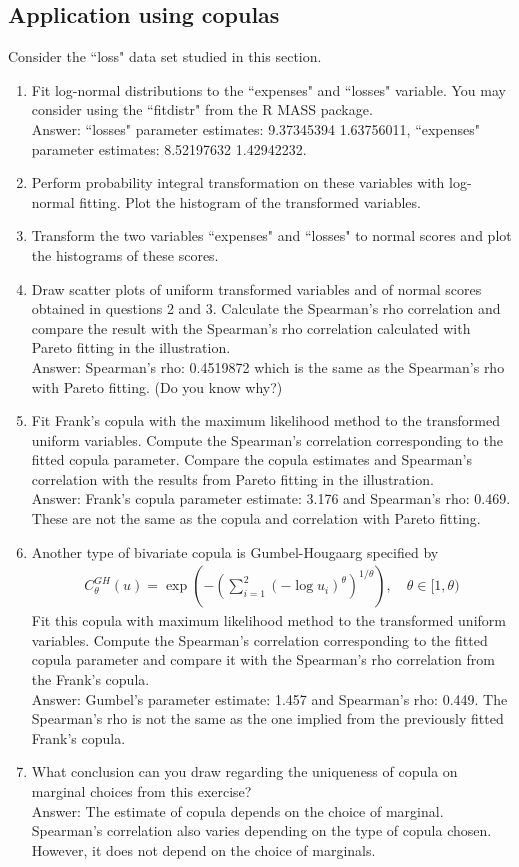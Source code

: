 \documentclass[11pt,a4paper,onecolumn]{article}
\begin{document}
\subsection{Application using copulas}
Consider the ``loss" data set studied in this section.
\begin{enumerate}
	\item Fit log-normal distributions to the ``expenses" and ``losses" variable. You may consider using the ``fitdistr" from the R MASS package. \\
	Answer: ``losses" parameter estimates: 9.37345394   1.63756011, ``expenses" parameter estimates:  8.52197632   1.42942232.
	\item Perform probability integral transformation on these variables with log-normal fitting. Plot the histogram of the transformed variables.
	\item Transform the two variables ``expenses" and ``losses" to normal scores and plot the histograms of these scores.
	\item Draw scatter plots of uniform transformed variables and of normal scores obtained in questions 2 and 3. Calculate the Spearman's rho correlation and compare the result with the Spearman's rho correlation calculated with Pareto fitting in the illustration. \\
	Answer: Spearman's rho: 0.4519872 which is the same as the Spearman's rho with Pareto fitting. (Do you know why?)
	\item Fit Frank's copula with the maximum likelihood method to the transformed uniform variables. Compute the Spearman's correlation corresponding to the fitted copula parameter. Compare the copula estimates and Spearman's correlation with the results from Pareto fitting in the illustration. \\
	Answer: Frank's copula parameter estimate: 3.176 and Spearman's rho: 0.469. These are not the same as the copula and correlation with Pareto fitting.
	\item Another type of bivariate copula is Gumbel-Hougaarg specified by
	\begin{align*}
	C_{\theta}^{GH}(u) = \exp\left(-\left(\sum_{i=1}^{2}(-\log u_i)^{\theta}\right)^{1/\theta}\right),\quad \theta \in [1,\theta)
	\end{align*}
	Fit this copula with maximum likelihood method to the transformed uniform variables. Compute the Spearman's correlation corresponding to the fitted copula parameter and compare it with the Spearman's rho correlation from the Frank's copula. \\
	Answer: Gumbel's parameter estimate: 1.457 and Spearman's rho: 0.449. The Spearman's rho is not the same as the one implied from the previously fitted Frank's copula.
	\item What conclusion can you draw regarding the uniqueness of copula on marginal choices from this exercise?\\
	Answer: The estimate of copula depends on the choice of marginal. Spearman's correlation also varies depending on the type of copula chosen. However, it does not depend on the choice of marginals.
\end{enumerate}
\end{document}
